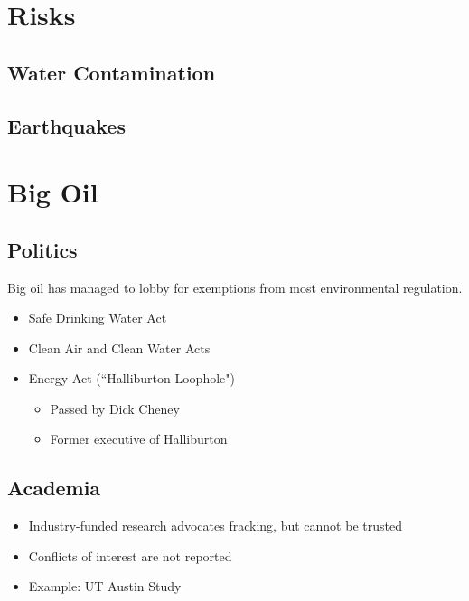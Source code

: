 \documentclass[pdf]{beamer}
\begin{document}
\section{Risks}
	\subsection{Water Contamination}
		
	\subsection{Earthquakes}
		

\section{Big Oil}
	\subsection{Politics}\begin{frame}
	Big oil has managed to lobby for exemptions from most environmental regulation. 
		\begin{itemize}
			\item Safe Drinking Water Act
			\item Clean Air and Clean Water Acts
			\item Energy Act (``Halliburton Loophole")
				\begin{itemize}
					\item Passed by Dick Cheney
					\item Former executive of Halliburton
				\end{itemize}
		\end{itemize}
	\end{frame}
	\subsection{Academia}\begin{frame}
		\begin{itemize}
			\item Industry-funded research advocates fracking, but cannot be trusted
			\item Conflicts of interest are not reported
			\item Example: UT Austin Study
		\end{itemize}
	\end{frame}
\end{document}
